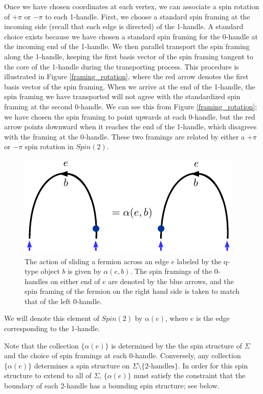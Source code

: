Once we have chosen coordinates at each vertex, we can associate a spin rotation of $+\pi$ or
$-\pi$ to each 1-handle.
First, we choose a standard spin framing at the incoming side (recall that each edge is directed) of the 1-handle.
A standard choice exists because we have chosen a standard spin framing for the 0-handle at the incoming end of the 1-handle. 
We then parallel transport the spin framing along the 1-handle, keeping the first basis vector of the spin framing tangent to 
the core of
the 1-handle during the transporting process.
This procedure is illustrated in Figure \ref{framing_rotation}, where the red arrow denotes the first basis vector of the spin framing. 
When we arrive at the end of the 1-handle, the spin framing we have transported will not agree with the standardized spin framing at the second 0-handle. 
We can see this from Figure \ref{framing_rotation}; we have chosen the spin framing to point upwards at each 0-handle, but the red arrow points downward when it reaches the end of the 1-handle, which disagrees with the framing at the 0-handle. 
These two framings are related by either a $+\pi$ or $-\pi$ spin rotation in $Spin(2)$.
\begin{figure}
\begin{center}
\includegraphics{alphae_defn.pdf}
\caption{\label{alphae_defn} The action of sliding a fermion across an edge $e$ labeled by the q-type object $b$ is given by $\alpha(e,b)$. 
The spin framings of the 0-handles on either end of $e$ are denoted by the blue arrows, 
and  the spin framing of the fermion on the right hand side is taken to match that of the left 0-handle. }
\end{center}
\end{figure}
We will denote this element of $Spin(2)$ by $\alpha(e)$, where $e$ is the edge corresponding to the 1-handle.

Note that the collection $\{\alpha(e)\}$ is determined by the the spin structure of $\Sigma$ and
the choice of spin framings at each 0-handle.
Conversely, any collection $\{\alpha(e)\}$ determines a spin structure on $\Sigma\setminus\{\mbox{2-handles}\}$.
In order for this spin structure to extend to all of $\Sigma$, $\{\alpha(e)\}$ must satisfy the constraint that the 
boundary of each 2-handle has a bounding spin structure; see below.

